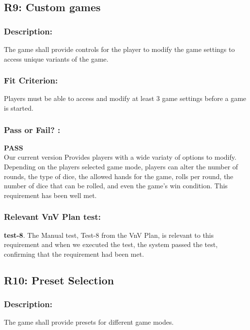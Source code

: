\documentclass[12pt, titlepage]{article}
\begin{document}
 
\subsection{R9: Custom games} 
\label{R9}

\subsubsection*{Description:}The game shall provide controls for the player to modify the game settings to access unique variants of the game.

\subsubsection*{Fit Criterion:}Players must be able to access and modify at least 3 game settings before a game is started.

\subsubsection*{Pass or Fail? :} 

 \noindent \textbf{PASS}\\
 
  Our current version Provides players with a wide variaty of options to modify. Depending on the players selected game mode, players can alter the number of rounds, the type of dice, the allowed hands for the game, rolls per round, the number of dice that can be rolled, and even the game's win condition. This requirement has been well met.

\subsubsection*{Relevant VnV Plan test: } \textbf{test-8}.  The Manual test, Test-8 from the VnV Plan, is relevant to this requirement and when we executed the test, the system passed the test, confirming that the requirement had been met.


\subsection{R10: Preset Selection} 
\label{R10} 

\subsubsection*{Description:}The game shall provide presets for different game modes.
\end{document}
